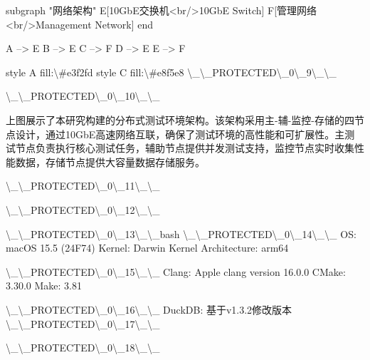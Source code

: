     subgraph "网络架构"
        E[10GbE交换机<br/>10GbE Switch]
        F[管理网络<br/>Management Network]
    end

    A --> E
    B --> E
    C --> F
    D --> E
    E --> F

    style A fill:\textbackslash{}#e3f2fd
    style C fill:\textbackslash{}#e8f5e8
\textbackslash{}_\textbackslash{}_PROTECTED\textbackslash{}_0\textbackslash{}_9\textbackslash{}_\textbackslash{}_

\textbackslash{}_\textbackslash{}_PROTECTED\textbackslash{}_0\textbackslash{}_10\textbackslash{}_\textbackslash{}_

上图展示了本研究构建的分布式测试环境架构。该架构采用主-辅-监控-存储的四节点设计，通过10GbE高速网络互联，确保了测试环境的高性能和可扩展性。主测试节点负责执行核心测试任务，辅助节点提供并发测试支持，监控节点实时收集性能数据，存储节点提供大容量数据存储服务。

\textbackslash{}_\textbackslash{}_PROTECTED\textbackslash{}_0\textbackslash{}_11\textbackslash{}_\textbackslash{}_

\textbackslash{}_\textbackslash{}_PROTECTED\textbackslash{}_0\textbackslash{}_12\textbackslash{}_\textbackslash{}_

\textbackslash{}_\textbackslash{}_PROTECTED\textbackslash{}_0\textbackslash{}_13\textbackslash{}_\textbackslash{}_bash
\textbackslash{}_\textbackslash{}_PROTECTED\textbackslash{}_0\textbackslash{}_14\textbackslash{}_\textbackslash{}_
OS: macOS 15.5 (24F74)
Kernel: Darwin Kernel
Architecture: arm64

\textbackslash{}_\textbackslash{}_PROTECTED\textbackslash{}_0\textbackslash{}_15\textbackslash{}_\textbackslash{}_
Clang: Apple clang version 16.0.0
CMake: 3.30.0
Make: 3.81

\textbackslash{}_\textbackslash{}_PROTECTED\textbackslash{}_0\textbackslash{}_16\textbackslash{}_\textbackslash{}_
DuckDB: 基于v1.3.2修改版本
\textbackslash{}_\textbackslash{}_PROTECTED\textbackslash{}_0\textbackslash{}_17\textbackslash{}_\textbackslash{}_

\textbackslash{}_\textbackslash{}_PROTECTED\textbackslash{}_0\textbackslash{}_18\textbackslash{}_\textbackslash{}_

